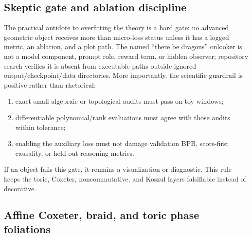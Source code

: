 \documentclass[11pt]{article}
\theoremstyle{definition}
\theoremstyle{plain}
\theoremstyle{remark}
\numberwithin{equation}{section}
\begin{document}
\subsection{Skeptic gate and ablation discipline}

The practical antidote to overfitting the theory is a hard gate: no advanced geometric object receives more than micro-loss status unless it has a logged metric, an ablation, and a plot path.  The named ``there be dragons'' onlooker is not a model component, prompt role, reward term, or hidden observer; repository search verifies it is absent from executable paths outside ignored output/checkpoint/data directories.  More importantly, the scientific guardrail is positive rather than rhetorical:
\begin{enumerate}[leftmargin=2em]
  \item exact small algebraic or topological audits must pass on toy windows;
  \item differentiable polynomial/rank evaluations must agree with those audits within tolerance;
  \item enabling the auxiliary loss must not damage validation BPB, score-first causality, or held-out reasoning metrics.
\end{enumerate}
If an object fails this gate, it remains a visualization or diagnostic.  This rule keeps the toric, Coxeter, noncommutative, and Koszul layers falsifiable instead of decorative.

\subsection{Affine Coxeter, braid, and toric phase foliations}
\end{document}
